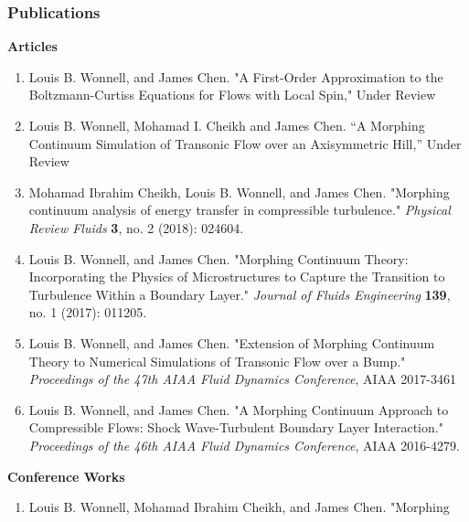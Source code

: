 \documentclass{beamer}
\begin{document}
\begin{frame}
 \frametitle{Publications}
 \textbf{Articles}
 \tiny
\begin{enumerate}
 \item Louis B. Wonnell, and James Chen. "A First-Order Approximation to the
Boltzmann-Curtiss Equations for Flows with Local Spin," Under Review
\item Louis B. Wonnell, Mohamad I. Cheikh and James Chen. ``A Morphing 
Continuum 
Simulation of Transonic Flow over an Axisymmetric Hill,'' Under Review
\item Mohamad Ibrahim Cheikh, Louis B. Wonnell, and James Chen. "Morphing 
continuum analysis of energy transfer in compressible turbulence." 
\textit{Physical Review Fluids} \textbf{3}, no. 2 (2018): 024604.
\item Louis B. Wonnell, and James Chen. "Morphing Continuum Theory: 
Incorporating the Physics of Microstructures to Capture the Transition to 
Turbulence Within a Boundary Layer." \textit{Journal of Fluids Engineering} 
\textbf{139}, no. 1 (2017): 011205. 
\item Louis B. Wonnell, and James Chen. "Extension of Morphing Continuum Theory 
to Numerical Simulations of Transonic Flow over a Bump." \textit{Proceedings of 
the 47th AIAA Fluid Dynamics Conference}, AIAA 2017-3461
\item Louis B. Wonnell, and James Chen. "A Morphing Continuum Approach to 
Compressible Flows: Shock Wave-Turbulent Boundary Layer Interaction." 
\textit{Proceedings of the 46th AIAA Fluid Dynamics Conference}, AIAA 2016-4279.
\end{enumerate}
\normalsize
\textbf{Conference Works}
\tiny
\begin{enumerate}
\item Louis B. Wonnell, Mohamad Ibrahim Cheikh, and James Chen. "Morphing 

\end{enumerate}
\end{frame}
\end{document}
